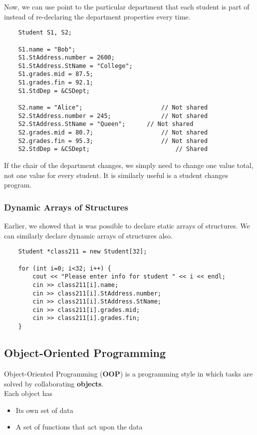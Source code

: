 \documentclass[]{article}
\begin{document}
Now, we can use point to the particular department that each student is part of instead of re-declaring the department properties every time.

\begin{lstlisting}
	Student S1, S2;
	
	S1.name = "Bob";
	S1.StAddress.number = 2600;
	S1.StAddress.StName = "College";
	S1.grades.mid = 87.5;
	S1.grades.fin = 92.1;
	S1.StdDep = &CSDept;
	
	S2.name = "Alice";						// Not shared
	S2.StAddress.number = 245;				// Not shared
	S2.StAddress.StName = "Queen";		// Not shared
	S2.grades.mid = 80.7;					// Not shared
	S2.grades.fin = 95.3;					// Not shared
	S2.StdDep = &CSDept;						// Shared
\end{lstlisting}\bigbreak

If the chair of the department changes, we simply need to change one value total, not one value for every student. It is similarly useful is a student changes program.


\subsubsection{Dynamic Arrays of Structures}
\bigbreak

Earlier, we showed that is was possible to declare static arrays of structures. We can similarly declare dynamic arrays of structures also.

\begin{lstlisting}
	Student *class211 = new Student[32];
	
	for (int i=0; i<32; i++) {
		cout << "Please enter info for student " << i << endl;
		cin >> class211[i].name;
		cin >> class211[i].StAddress.number;
		cin >> class211[i].StAddress.StName;
		cin >> class211[i].grades.mid;
		cin >> class211[i].grades.fin;
	}
\end{lstlisting}\bigbreak


\subsection{Object-Oriented Programming}

Object-Oriented Programming (\textbf{OOP}) is a programming style in which tasks are solved by collaborating \textbf{objects}.\\

Each object has

\begin{itemize}
	\item Its own set of data
	\item A set of functions that act upon the data
\end{itemize}\bigbreak
\end{document}
